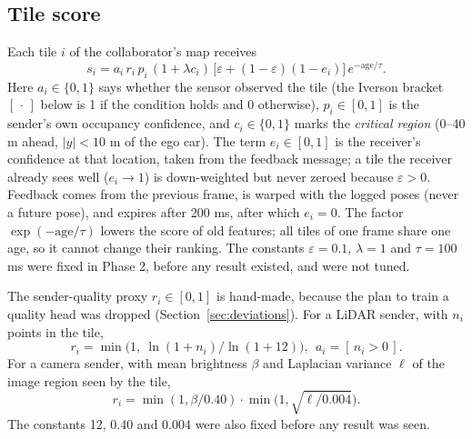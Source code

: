 \documentclass[conference]{IEEEtran}
\begin{document}
\subsection{Tile score}
Each tile $i$ of the collaborator's map receives
\begin{equation}
s_i=a_i\,r_i\,p_i\,(1+\lambda c_i)\,\bigl[\varepsilon+(1-\varepsilon)(1-e_i)\bigr]\,e^{-\mathrm{age}/\tau}.\label{eq:score}
\end{equation}
Here $a_i\in\{0,1\}$ says whether the sensor observed the tile (the Iverson bracket $[\,\cdot\,]$ below is 1 if the condition holds and 0 otherwise), $p_i\in[0,1]$ is the sender's own occupancy confidence, and $c_i\in\{0,1\}$ marks the \emph{critical region} (0--40 m ahead, $|y|<10$ m of the ego car). The term $e_i\in[0,1]$ is the receiver's confidence at that location, taken from the feedback message; a tile the receiver already sees well ($e_i\to1$) is down-weighted but never zeroed because $\varepsilon>0$. Feedback comes from the previous frame, is warped with the logged poses (never a future pose), and expires after 200 ms, after which $e_i=0$. The factor $\exp(-\mathrm{age}/\tau)$ lowers the score of old features; all tiles of one frame share one age, so it cannot change their ranking. The constants $\varepsilon=0.1$, $\lambda=1$ and $\tau=100$ ms were fixed in Phase 2, before any result existed, and were not tuned.

The sender-quality proxy $r_i\in[0,1]$ is hand-made, because the plan to train a quality head was dropped (Section~\ref{sec:deviations}). For a LiDAR sender, with $n_i$ points in the tile,
\begin{equation}
r_i=\min\!\bigl(1,\ \ln(1+n_i)/\ln(1+12)\bigr),\ \ a_i=[\,n_i>0\,].\label{eq:rlidar}
\end{equation}
For a camera sender, with mean brightness $\beta$ and Laplacian variance $\ell$ of the image region seen by the tile,
\begin{equation}
r_i=\min(1,\beta/0.40)\cdot\min\!\bigl(1,\sqrt{\ell/0.004}\bigr).\label{eq:rcam}
\end{equation}
The constants 12, 0.40 and 0.004 were also fixed before any result was seen.
\end{document}
